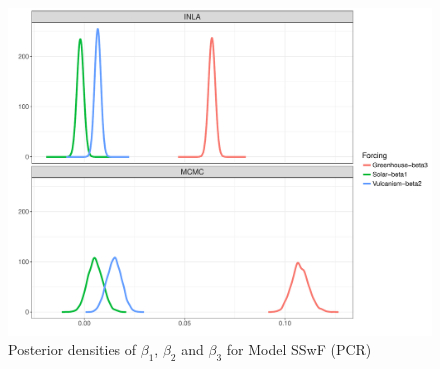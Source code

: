 \documentclass[11pt]{amsart}
\theoremstyle{plain}
\theoremstyle{definition}
\theoremstyle{remark}
\begin{document}
\begin{figure}[H]
  \centering
  \includegraphics[scale=0.4]{PlotBetas}
  \caption{Posterior densities of $\beta_1$, $\beta_2$ and $\beta_3$ for Model SSwF
  (PCR)}
  \label{fig:betas}
\end{figure}
\end{document}

